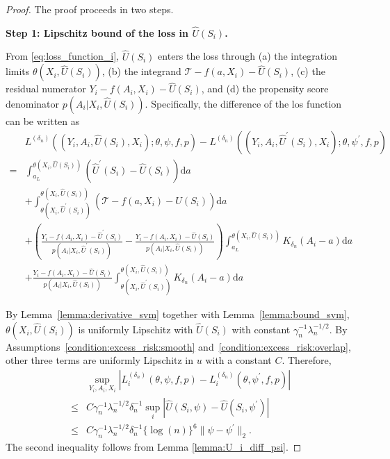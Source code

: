 \documentclass[12pt]{article}
\begin{document}
\begin{proof}
The proof proceeds in two steps.

\noindent\textbf{Step 1: Lipschitz bound of the loss in $\widehat U(S_i)$.}

From \eqref{eq:loss_function_i}, $\widehat U(S_i)$ enters the loss through (a) the integration limits $\theta(X_i,\widehat U(S_i))$, (b) the integrand $\mathcal{T}-f(a,X_i)-\widehat U(S_i)$, (c) the residual numerator $Y_i-f(A_i,X_i)-\widehat U(S_i)$, and (d) the propensity score denominator $p(A_i|X_i,\widehat U(S_i))$. Specifically, the difference of the los function can be written as
\begin{align*}
    &L^{(\delta_n)}((Y_i,A_i,\widehat U(S_i),X_i);\theta,\psi,f,p) - L^{(\delta_n)}((Y_i,A_i,\widehat U^\prime(S_i),X_i);\theta,\psi^\prime,f,p)\\
 = & \int_{a_L}^{\theta(X_i,\widehat U(S_i))}(\widehat U^\prime(S_i)-\widehat U(S_i))\mathrm{d}a \\
 & + \int_{\theta(X_i,\widehat U^\prime(S_i))}^{\theta(X_i,\widehat U(S_i))}(\mathcal{T}-f(a,X_i)-\widehat U(S_i))\mathrm{d}a\\
 & + \left(\frac{Y_i - f(A_i,X_i)-\widehat U^\prime(S_i)}{p(A_i|X_i,\widehat U^\prime(S_i))}- \frac{Y_i - f(A_i,X_i)-\widehat U(S_i)}{p(A_i|X_i,\widehat U(S_i))}\right)\int_{a_L}^{\theta(X_i,\widehat U(S_i))} K_{\delta_n}(A_i-a)\mathrm{d}a\\
 & + \frac{Y_i - f(A_i,X_i)-\widehat U(S_i)}{p(A_i|X_i,\widehat U(S_i))}\int_{\theta(X_i,\widehat U^\prime(S_i))}^{\theta(X_i,\widehat U(S_i))} K_{\delta_n}(A_i-a)\mathrm{d}a
\end{align*}



By Lemma~\ref{lemma:derivative_svm} together with Lemma~\ref{lemma:bound_svm}, $\theta(X_i,\widehat U(S_i))$ is uniformly Lipschitz with $\widehat U(S_i)$ with constant $\gamma_n^{-1}\lambda_n^{-1/2}$. By Assumptions~\ref{condition:excess_risk:smooth} and~\ref{condition:excess_risk:overlap}, other three terms are uniformly Lipschitz in $u$ with a constant $C$. Therefore, 
\begin{align*}
&\sup_{Y_i,A_i,X_i}\left|L^{(\delta_n)}_i(\theta,\psi,f,p) - L^{(\delta_n)}_i(\theta,\psi^\prime,f,p)\right|\\
    \leq &C\gamma_n^{-1}\lambda_n^{-1/2} \delta_n^{-1}\sup_i\left|\widehat U(S_i,\psi) - \widehat U(S_i,\psi^\prime)\right|\\
    \leq & C\gamma_n^{-1}\lambda_n^{-1/2} \delta_n^{-1}\{\log(n)\}^6\|\psi - \psi^\prime\|_2.
\end{align*}
The second inequality follows from Lemma \ref{lemma:U_i_diff_psi}. 


\end{proof}
\end{document}
